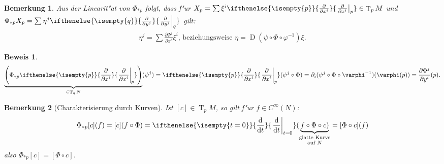 \documentclass[paper=A4, twoside, chapterprefix=true, bibliography=totoc, headsepline]{scrbook}
\let\temp\phi
\let\phi\varphi
\let\varphi\temp
\let\temp\theta
\let\theta\vartheta
\let\vartheta\temp
\let\temp\epsilon
\let\epsilon\varepsilon
\let\varepsilon\temp
\let\temp\rho
\let\rho\varrho
\let\varrho\temp
\DeclareMathOperator{\D}{D} %
\DeclareMathOperator{\T}{T} %
\newcommand{\dop}{\mathrm{d}}
\newcommand{\difffrac}[3][]{\ifthenelse{\isempty{#1}}{\frac{\dop #2}{\dop #3}}{\left. \frac{\dop #2}{\dop #3} \right|_{#1}}}
\newcommand{\pdifffrac}[3][]{\ifthenelse{\isempty{#1}}{\frac{\partial #2}{\partial #3}}{\left. \frac{\partial #2}{\partial #3} \right|_{#1}}}
\theoremstyle{plain}
\theoremstyle{nonumberplain}
\newtheorem{bem}{Bemerkung}
\newtheorem{bew}{Beweis}
\theoremstyle{empty}
\theoremstyle{break}
\begin{document}
\begin{bem}
  Aus der Linearit"at von $\Phi_{*p}$ folgt, dass f"ur $X_p = \sum \xi^i\pdifffrac[p]{}{x^i} \in \T_pM$ und $\Phi_{*p}X_p = \sum \eta^j\pdifffrac[q]{}{y^j}$ gilt:
  \begin{align*}
    \eta^j = \sum \frac{\partial \Phi^j}{\partial x^i}\xi^i \text{, beziehungsweise } \eta = \D(\psi \circ \Phi \circ \phi^{-1})\xi.
  \end{align*}
\end{bem}

\begin{bew}
  \begin{align*}
    \underbrace{\left(\Phi_{*p}\pdifffrac[p]{}{x^i}\right)}_{\in \T_qN}(\psi^j) = \pdifffrac[p]{}{x^i}(\psi^j \circ \Phi) = \partial_i (\psi^j \circ \Phi \circ \phi^{-1})(\phi(p)) = \frac{\partial \Phi^j}{\partial y^i}(p).
  \end{align*}
\end{bew}

\begin{bem}[Charakterisierung durch Kurven]
  Ist $[c] \in \T_p M$, so gilt f"ur $f \in C^{\infty}(N)$:
  \begin{align*}
    \Phi_{*p}[c](f) = [c](f \circ \Phi) = \difffrac[t=0]{}{t}(\underbrace{f \circ \Phi \circ c)}_{\substack{\text{glatte Kurve}\\ \text{auf }N}} = [\Phi \circ c](f)
  \end{align*}
  also $\Phi_{*p}[c] = [\Phi \circ c]$.
\end{bem}
\end{document}
